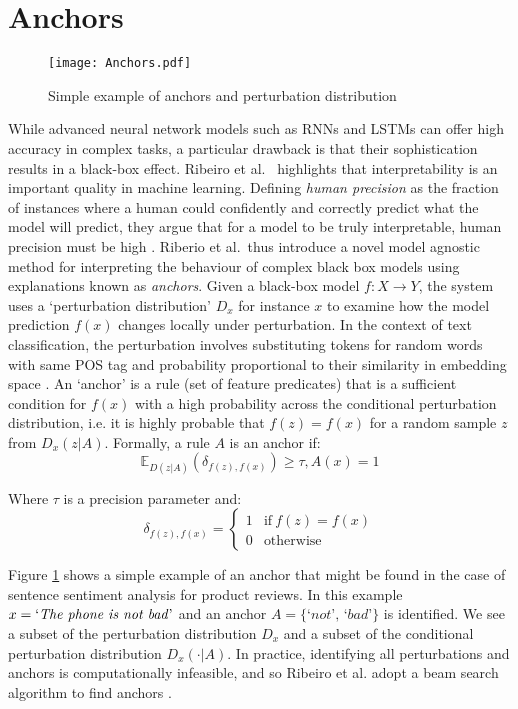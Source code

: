 \documentclass[Dissertation.tex]{subfiles}
\begin{document}
\section{Anchors}

\begin{figure}
	\centering
	\texttt{[image: Anchors.pdf]}
	\caption{Simple example of anchors and perturbation distribution}
	\label{fig:Anchors}
\end{figure}
While advanced neural network models such as RNNs and LSTMs can offer high accuracy in complex tasks, a particular drawback is that their sophistication results in a black-box effect. Ribeiro et al.\ \cite{ribeiroAnchorsHighPrecision} highlights that interpretability is an important quality in machine learning. Defining \textit{human precision} as the fraction of instances where a human could confidently and correctly predict what the model will predict, they argue that for a model to be truly interpretable, human precision must be high \cite{ribeiroAnchorsHighPrecision}. Riberio et al.\ thus introduce a novel model agnostic method for interpreting the behaviour of complex black box models using explanations known as \textit{anchors}. Given a black-box model $ f: X \rightarrow Y $, the system uses a `perturbation distribution' $ D_x $ for instance $ x$ to examine how the model prediction $ f(x) $ changes locally under perturbation. In the context of text classification, the perturbation involves substituting tokens for random words with same POS tag and probability proportional to their similarity in embedding space \cite{ribeiroAnchorsHighPrecision}. An `anchor' is a rule (set of feature predicates) that is a sufficient condition for $ f(x) $ with a high probability across the conditional perturbation distribution, i.e. it is highly probable that $f(z)=f(x)  $ for a random sample $ z $ from $ D_x(z|A) $. Formally, a rule $ A $ is an anchor if:
\[ \mathbb{E}_{D(z|A)}(\delta_{f(z),f(x)}) \geq \tau, A(x)=1 \]

Where $ \tau $ is a precision parameter and: \[  \delta_{f(z),f(x)} =\begin{cases}
1 & \text{if}\ f(z)=f(x)\\
0 &  \text{otherwise}
\end{cases} 	\]

Figure \ref{fig:Anchors} shows a simple example of an anchor that might be found in the case of sentence sentiment analysis for product reviews. In this example $ x = \text{`\textit{The phone is not bad}'} $ and an anchor $ A=\{\textit{`not', `bad'}\} $ is identified. We see a subset of the perturbation distribution $ D_x $ and a subset of the conditional perturbation distribution $ D_x(\cdot|A) $. In practice, identifying all perturbations and anchors is computationally infeasible, and so Ribeiro et al. adopt a beam search algorithm to find anchors \cite{ribeiroAnchorsHighPrecision}.
\end{document}
